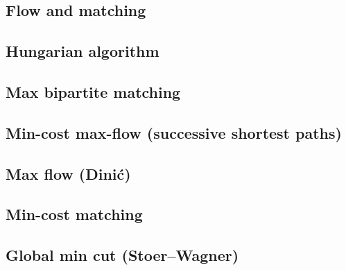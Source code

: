 \documentclass[9pt]{extarticle}
\begin{document}
\begin{multicols*}{3}
\setlength{\parskip}{0.0in}
\tableofcontents
\setlength{\parskip}{0.1in}
\section{Flow and matching}

\subsection{Hungarian algorithm} %


\subsection{Max bipartite matching} %


\pagebreak

\subsection{Min-cost max-flow (successive shortest paths)}


\subsection{Max flow (Dini\'c)} %


\subsection{Min-cost matching} %


\subsection{Global min cut (Stoer--Wagner)} %



\end{multicols*}
\end{document}
